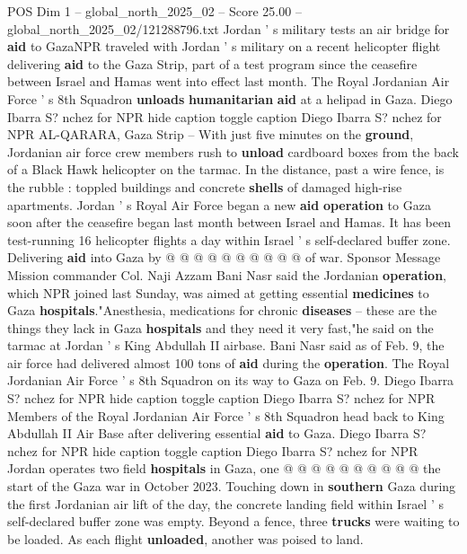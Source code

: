 \begin{textsample}{POS Dim 1 – global\_north\_2025\_02 – Score 25.00 – global\_north\_2025\_02/121288796.txt}  \label{ex:f1_pos_439}
Jordan ' s military tests an air bridge for \textbf{aid} to GazaNPR traveled with Jordan ' s military on a recent helicopter flight delivering \textbf{aid} to the Gaza Strip, part of a test program since the ceasefire between Israel and Hamas went into effect last month.
The Royal Jordanian Air Force ' s 8th Squadron \textbf{unloads} \textbf{humanitarian} \textbf{aid} at a helipad in Gaza.
Diego Ibarra S? nchez for NPR hide caption toggle caption Diego Ibarra S? nchez for NPR AL-QARARA, Gaza Strip -- With just five minutes on the \textbf{ground}, Jordanian air force crew members rush to \textbf{unload} cardboard boxes from the back of a Black Hawk helicopter on the tarmac.
In the distance, past a wire fence, is the rubble : toppled buildings and concrete \textbf{shells} of damaged high-rise apartments.
Jordan ' s Royal Air Force began a new \textbf{aid} \textbf{operation} to Gaza soon after the ceasefire began last month between Israel and Hamas.
It has been test-running 16 helicopter flights a day within Israel ' s self-declared buffer zone.
Delivering \textbf{aid} into Gaza by @ @ @ @ @ @ @ @ @ @ of war.
Sponsor Message Mission commander Col.
Naji Azzam Bani Nasr said the Jordanian \textbf{operation}, which NPR joined last Sunday, was aimed at getting essential \textbf{medicines} to Gaza \textbf{hospitals}."Anesthesia, medications for chronic \textbf{diseases} -- these are the things they lack in Gaza \textbf{hospitals} and they need it very fast,"he said on the tarmac at Jordan ' s King Abdullah II airbase.
Bani Nasr said as of Feb. 9, the air force had delivered almost 100 tons of \textbf{aid} during the \textbf{operation}.
The Royal Jordanian Air Force ' s 8th Squadron on its way to Gaza on Feb. 9.
Diego Ibarra S? nchez for NPR hide caption toggle caption Diego Ibarra S? nchez for NPR Members of the Royal Jordanian Air Force ' s 8th Squadron head back to King Abdullah II Air Base after delivering essential \textbf{aid} to Gaza.
Diego Ibarra S? nchez for NPR hide caption toggle caption Diego Ibarra S? nchez for NPR Jordan operates two field \textbf{hospitals} in Gaza, one @ @ @ @ @ @ @ @ @ @ the start of the Gaza war in October 2023.
Touching down in \textbf{southern} Gaza during the first Jordanian air lift of the day, the concrete landing field within Israel ' s self-declared buffer zone was empty.
Beyond a fence, three \textbf{trucks} were waiting to be loaded.
As each flight \textbf{unloaded}, another was poised to land.

\end{textsample}

